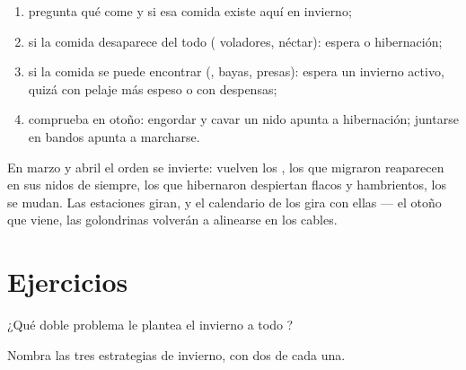 \begin{method}\label{met:g3:animals-through-seasons:guess}
\begin{enumerate}
  \item pregunta qué come y si esa comida existe aquí en invierno;
  \item si la comida desaparece del todo ( voladores, néctar):
        espera  o hibernación;
  \item si la comida se puede encontrar (, bayas, presas):
        espera un invierno activo, quizá con pelaje más espeso o con
        despensas;
  \item comprueba en otoño: engordar y cavar un nido apunta a
        hibernación; juntarse en bandos apunta a marcharse.
\end{enumerate}
\end{method}

\begin{example}\label{ex:g3:animals-through-seasons:spring}
En marzo y abril el orden se invierte: vuelven los , los que
migraron reaparecen en sus nidos de siempre, los que hibernaron
despiertan flacos y hambrientos, los  se mudan. Las
estaciones giran, y el calendario de los  gira con ellas ---
el otoño que viene, las golondrinas volverán a alinearse en los cables.
\end{example}

\section{Ejercicios}

\begin{exercise}[$\star$]\label{exo:g3:animals-through-seasons:1}
¿Qué doble problema le plantea el invierno a todo ?
\end{exercise}

\begin{exercise}[$\star$]\label{exo:g3:animals-through-seasons:2}
Nombra las tres estrategias de invierno, con dos  de cada una.
\end{exercise}

